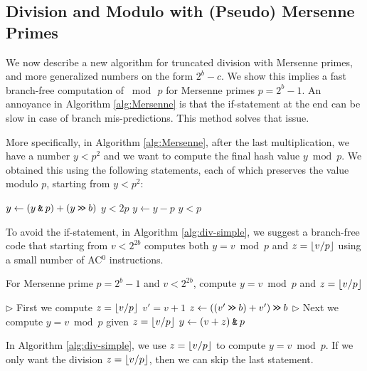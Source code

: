 



\subsection{Division and Modulo with (Pseudo) Mersenne Primes}\label{subsec:intro-division}

We now describe a new algorithm for truncated division with Mersenne primes, and more generalized numbers on the form $2^b-c$.
We show this implies a fast branch-free computation of $\bmod\,p$ for
Mersenne primes $p=2^b-1$.
An annoyance in Algorithm \ref{alg:Mersenne}
is that the if-statement at the end can be slow in case of branch mis-predictions.
This method solves that issue.

More specifically, in Algorithm \ref{alg:Mersenne}, after the last
multiplication, we have a number $y<p^2$ and we want to compute the
final hash value $y\bmod p$. We obtained this using the following
statements, each of which preserves the value modulo $p$, starting from
$y<p^2$:
\begin{algorithmic}
	\State $y \gets (y\mathbin{\texttt{\&}} p)+(y\mathbin{\texttt{>\!>}} b)$
	\Comment $y<2p$
	\State $y\gets y-p$
	\Comment  $y<p$
	\EndIf
\end{algorithmic}
To avoid the if-statement, in Algorithm \ref{alg:div-simple}, we suggest
a branch-free code that starting
from $v<2^{2b}$ computes both $y=v\bmod p$ and $z=\lfloor {v/p} \rfloor$ using
a small number of AC$^0$ instructions.
\begin{algorithm}[H]
	\caption{For Mersenne prime $p=2^b-1$ and $v< 2^{2b}$, compute
		\label{alg:div-simple}
		$y=v\bmod p$ and $z=\lfloor {v/p} \rfloor$}
	\begin{algorithmic}
		\State $\rhd$ First we compute $z=\lfloor {v/p} \rfloor$
		\State $v'=v+1$
		\State $z \gets(( v' \mathbin{\texttt{>\!>}} b)+v')\mathbin{\texttt{>\!>}} b$
		\State $\rhd$ Next we compute $y=v\bmod p$ given $z=\lfloor {v/p} \rfloor$
		\State $y \gets (v + z) \mathbin{\texttt{\&}} p $
	\end{algorithmic}
\end{algorithm}
In Algorithm \ref{alg:div-simple}, we use
$z=\lfloor {v/p} \rfloor$ to compute $y=v\bmod p$. If we only want the
division $z=\lfloor {v/p} \rfloor$, then we can skip the last statement.

